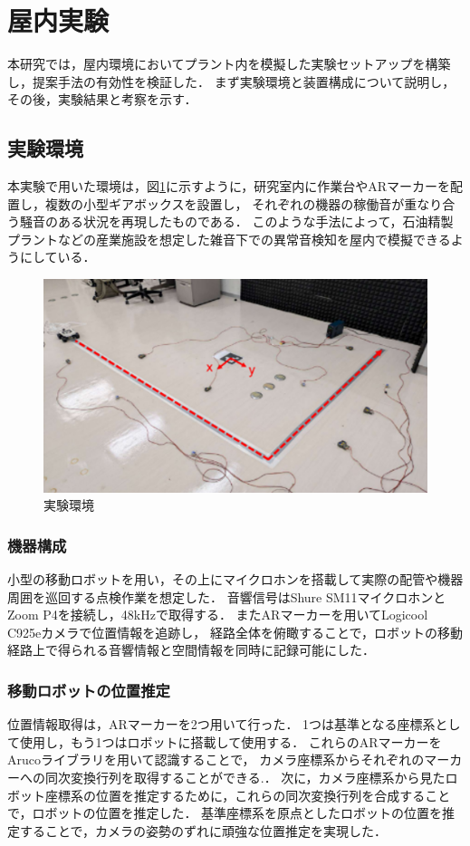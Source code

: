 \documentclass[../main]{subfiles}
\begin{document}
\section{屋内実験} \label{sec:indoor_experiment}

本研究では，屋内環境においてプラント内を模擬した実験セットアップを構築し，提案手法の有効性を検証した．
まず実験環境と装置構成について説明し，その後，実験結果と考察を示す．

\subsection{実験環境} \label{subsec:vexp_ref_environmet}

本実験で用いた環境は，図\ref{fig:exp_setup}に示すように，研究室内に作業台やARマーカーを配置し，複数の小型ギアボックスを設置し，
それぞれの機器の稼働音が重なり合う騒音のある状況を再現したものである．
このような手法によって，石油精製プラントなどの産業施設を想定した雑音下での異常音検知を屋内で模擬できるようにしている．
\begin{figure}[t]
  \centering
  \includegraphics[keepaspectratio, width=0.7\linewidth]{chap4/env_experiment.png}
  \caption{実験環境}
  \label{fig:exp_setup}
\end{figure}


\subsubsection{機器構成} \label{subsubsec:device_config}

小型の移動ロボットを用い，その上にマイクロホンを搭載して実際の配管や機器周囲を巡回する点検作業を想定した．
音響信号はShure SM11マイクロホンとZoom P4を接続し，48kHzで取得する．
またARマーカーを用いてLogicool C925eカメラで位置情報を追跡し，
経路全体を俯瞰することで，ロボットの移動経路上で得られる音響情報と空間情報を同時に記録可能にした．

\subsubsection{移動ロボットの位置推定}
位置情報取得は，ARマーカーを2つ用いて行った．
1つは基準となる座標系として使用し，もう1つはロボットに搭載して使用する．
これらのARマーカーをArucoライブラリを用いて認識することで，
カメラ座標系からそれぞれのマーカーへの同次変換行列を取得することができる\cite{aruco2014}.．
次に，カメラ座標系から見たロボット座標系の位置を推定するために，これらの同次変換行列を合成することで，ロボットの位置を推定した．
基準座標系を原点としたロボットの位置を推定することで，カメラの姿勢のずれに頑強な位置推定を実現した．
\end{document}
